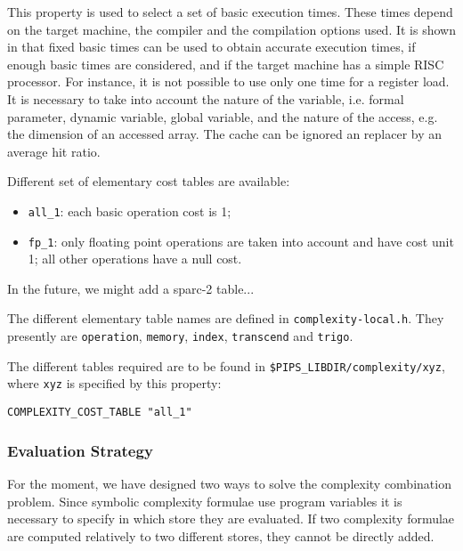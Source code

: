 This property is used to select a set of basic execution times. These
times depend on the target machine, the compiler and the compilation
options used. It is shown in \cite{Z94} that fixed basic times can be
used to obtain accurate execution times, if enough basic times are
considered, and if the target machine has a simple RISC processor. For
instance, it is not possible to use only one time for a register
load. It is necessary to take into account the nature of the variable,
i.e. formal parameter, dynamic variable, global variable, and the nature
of the access, e.g. the dimension of an accessed array. The cache can be
ignored an replacer by an average hit ratio.

Different set of elementary cost tables are available:

\begin{itemize}

  \item \verb+all_1+: each basic operation cost is 1;

  \item \verb+fp_1+: only floating point operations are taken into
account and have cost unit 1; all other operations have a null cost.

\end{itemize}

In the future, we might add a sparc-2 table...

The different elementary table names are defined in
\verb+complexity-local.h+. They presently are \verb+operation+, 
\verb+memory+, \verb+index+, \verb+transcend+
and \verb+trigo+.

The different tables required are to be found in
\verb+$PIPS_LIBDIR/complexity/xyz+,
where \verb+xyz+ is specified by this property:

\begin{verbatim}
COMPLEXITY_COST_TABLE "all_1"
\end{verbatim}

\subsubsection{Evaluation Strategy}

For the moment, we have designed two ways to solve the complexity
combination problem. Since symbolic complexity formulae use program
variables it is necessary to specify in which store they are
evaluated. If two complexity formulae are computed relatively to two
different stores, they cannot be directly added.

